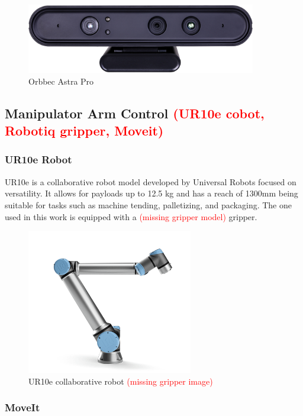 \begin{figure}[h]
\centerline{\includegraphics[height=1.2in]{figs/Astra.jpg}}
\caption[Orbbec Astra Pro]{Orbbec Astra Pro \cite{AstraPro}}
\label{fig:orbbec_astra_pro}
\end{figure}

\subsection{Manipulator Arm Control \textcolor{red}{(UR10e cobot, Robotiq gripper, Moveit)}}

\subsubsection{UR10e Robot}

UR10e is a collaborative robot model developed by Universal Robots focused on versatility. It allows for payloads up to 12.5 kg and has a reach of 1300mm being suitable for tasks such as machine tending, palletizing, and packaging\cite{UR10e}. The one used in this work is equipped with a \textcolor{red}{(missing gripper model)} gripper.

\begin{figure}[h]
\centerline{\includegraphics[height=2.5in]{figs/UR10e.png}}
\caption[UR10e]{UR10e collaborative robot \cite{UR10e_image} \textcolor{red}{(missing gripper image)}}
\label{fig:ur10e}
\end{figure}

\subsubsection{MoveIt}

